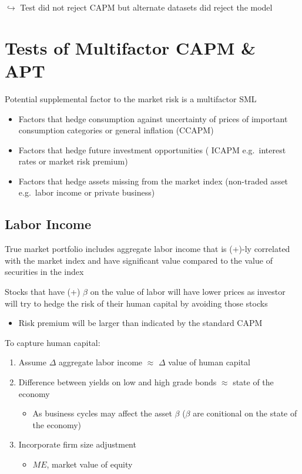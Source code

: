 \documentclass[]{book}
\providecommand{\tightlist}{%
  \setlength{\itemsep}{0pt}\setlength{\parskip}{0pt}}
\theoremstyle{definition}
\theoremstyle{definition}
\theoremstyle{remark}
\begin{document}
\(\hookrightarrow\) Test did not reject CAPM but alternate datasets did
reject the model

\section{Tests of Multifactor CAPM \&
APT}\label{tests-of-multifactor-capm-apt}

Potential supplemental factor to the market risk is a multifactor SML

\begin{itemize}
\tightlist
\item
  Factors that hedge consumption against uncertainty of prices of
  important consumption categories or general inflation (CCAPM)
\item
  Factors that hedge future investment opportunities ( ICAPM
  e.g.~interest rates or market risk premium)
\item
  Factors that hedge assets missing from the market index (non-traded
  asset e.g.~labor income or private business)
\end{itemize}

\subsection{Labor Income}\label{labor-income}

True market portfolio includes aggregate labor income that is (+)-ly
correlated with the market index and have significant value compared to
the value of securities in the index

Stocks that have (+) \(\beta\) on the value of labor will have lower
prices as investor will try to hedge the risk of their human capital by
avoiding those stocks

\begin{itemize}
\tightlist
\item
  Risk premium will be larger than indicated by the standard CAPM
\end{itemize}

To capture human capital:

\begin{enumerate}
\def\labelenumi{\arabic{enumi})}
\item
  Assume \(\Delta\) aggregate labor income \(\approx\) \(\Delta\) value
  of human capital
\item
  Difference between yields on low and high grade bonds \(\approx\)
  state of the economy

  \begin{itemize}
  \tightlist
  \item
    As business cycles may affect the asset \(\beta\) (\(\beta\) are
    conitional on the state of the economy)
  \end{itemize}
\item
  Incorporate firm size adjustment

  \begin{itemize}
  \tightlist
  \item
    \(ME\), market value of equity
  \end{itemize}
\end{enumerate}
\end{document}
